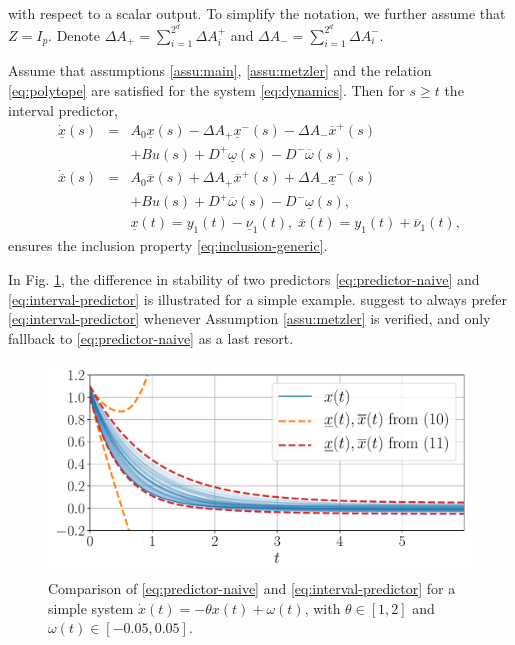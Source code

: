 \documentclass[letterpaper, 10 pt, conference]{ieeeconf}  %
\begin{document}
with respect to a scalar output. To simplify the notation, we
further assume that $Z=I_{p}$. Denote $\Delta A_{+}=\sum_{i=1}^{2^{d}}\Delta A_{i}^{+}$
and $\Delta A_{-}=\sum_{i=1}^{2^{d}}\Delta A_{i}^{-}$.%
\begin{proposition}
 \label{prop:predictor}
Assume that assumptions \ref{assu:main}, \ref{assu:metzler} and
the relation \eqref{eq:polytope} are satisfied for the system \eqref{eq:dynamics}.
Then for $s\geq t$ the interval predictor,
\begin{eqnarray}
\dot{\underline{x}}(s) & = & A_{0}\underline{x}(s)-\Delta A_{+}\underline{x}^{-}(s)-\Delta A_{-}\overline{x}^{+}(s)\nonumber \\
 &  & +Bu(s)+D^{+}\underline{\omega}(s)-D^{-}\overline{\omega}(s),\nonumber \\
\dot{\overline{x}}(s) & = & A_{0}\overline{x}(s)+\Delta A_{+}\overline{x}^{+}(s)+\Delta A_{-}\underline{x}^{-}(s)\label{eq:interval-predictor}\\
 &  & +Bu(s)+D^{+}\overline{\omega}(s)-D^{-}\underline{\omega}(s),\nonumber \\
 &  & \underline{x}(t)=y_{1}(t)-\underline{\nu}_{1}(t),\;\overline{x}(t)=y_{1}(t)+\overline{\nu}_{1}(t),\nonumber 
\end{eqnarray}
ensures the inclusion property \eqref{eq:inclusion-generic}.
\end{proposition}
In Fig. \ref{fig:predictor_example}, the difference in stability
of two predictors \eqref{eq:predictor-naive} and \eqref{eq:interval-predictor}
is illustrated for a simple example. \cite{leurent2019interval} suggest to always prefer
\eqref{eq:interval-predictor} whenever Assumption \ref{assu:metzler}
is verified, and only fallback to \eqref{eq:predictor-naive} as a
last resort. 
\begin{figure}
\begin{centering}
\includegraphics[width=1\linewidth]{img/interval-predictor}
\par\end{centering}
\caption{\label{fig:predictor_example} Comparison of \eqref{eq:predictor-naive}
and \eqref{eq:interval-predictor} for a simple system $\dot{x}(t)=-\theta x(t)+\omega(t)$,
with $\theta\in[1,2]$ and $\omega(t)\in[-0.05,0.05]$.}
\end{figure}
\end{document}
